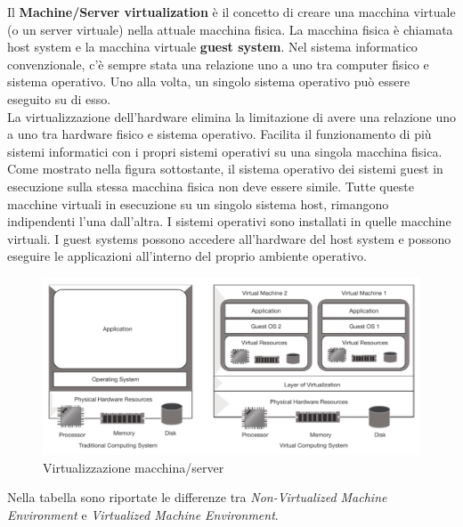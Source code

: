 \documentclass{article}
\begin{document}
Il \textbf{Machine/Server virtualization} è il concetto di creare una macchina virtuale (o un server virtuale) nella attuale macchina fisica. La macchina fisica è chiamata host system e la macchina virtuale \textbf{guest system}. Nel sistema informatico convenzionale, c'è sempre stata una relazione uno a uno tra computer fisico e sistema operativo. Uno alla volta, un singolo sistema operativo può essere eseguito su di esso. \\
La virtualizzazione dell'hardware elimina la limitazione di avere una relazione uno a uno tra hardware fisico e sistema operativo. Facilita il funzionamento di più sistemi informatici con i propri sistemi operativi su una singola macchina fisica. Come mostrato nella figura sottostante, il sistema operativo dei sistemi guest in esecuzione sulla stessa macchina fisica non deve essere simile. Tutte queste macchine virtuali in esecuzione su un singolo sistema host, rimangono indipendenti l'una dall'altra. I sistemi operativi sono installati in quelle macchine virtuali. I guest systems possono accedere all'hardware del host system e possono eseguire le applicazioni all'interno del proprio ambiente operativo. 
\begin{figure}[H]
    \centering
    \includegraphics[scale=0.5]{img/machine-server virtualizzation.png}
    \caption{Virtualizzazione macchina/server}
\end{figure}\noindent
Nella tabella sono riportate le differenze tra \textit{Non-Virtualized Machine Environment} e \textit{Virtualized Machine Environment}. \\
\end{document}
